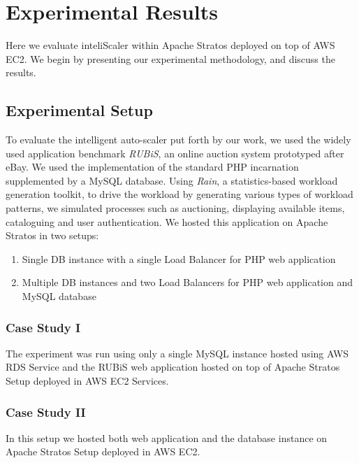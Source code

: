 \section{Experimental Results}
Here we evaluate inteliScaler within Apache Stratos deployed on top of AWS EC2. We begin by presenting our experimental methodology, and discuss the results. \\

\subsection{Experimental Setup}
To evaluate the intelligent auto-scaler put forth by our work, we used the widely used application benchmark \textit{RUBiS}, an online auction system prototyped after eBay. We used the implementation of the standard PHP incarnation supplemented by a MySQL database. Using \textit{Rain}, a statistics-based workload generation toolkit, to drive the workload by generating various types of workload patterns, we simulated processes such as auctioning, displaying available items, cataloguing and user authentication. We hosted this application on Apache Stratos in two setups:\\

\begin{enumerate}
\item Single DB instance with a single Load Balancer for PHP web application
\item Multiple DB instances and two Load Balancers for PHP web application and MySQL database
\end{enumerate}

\subsubsection{Case Study I}
The experiment was run using only a single MySQL instance hosted using AWS RDS Service and the RUBiS web application hosted on top of Apache Stratos Setup deployed in AWS EC2 Services. \\

\subsubsection{Case Study II}
In this setup we hosted both web application and the database instance on Apache Stratos Setup deployed in AWS EC2.
